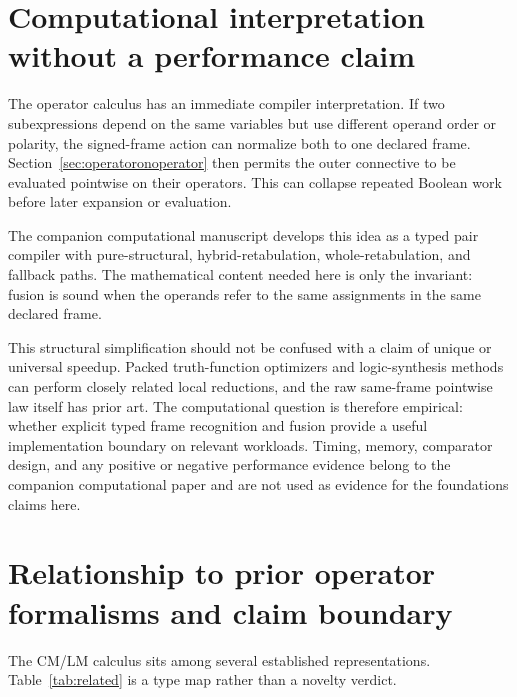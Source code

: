 \documentclass[11pt]{article}
\theoremstyle{definition}
\theoremstyle{remark}
\begin{document}
\section{Computational interpretation without a performance claim}
\label{sec:computational}

The operator calculus has an immediate compiler interpretation.  If two subexpressions depend on the same variables but use different operand order or polarity, the signed-frame action can normalize both to one declared frame.  Section~\ref{sec:operatoronoperator} then permits the outer connective to be evaluated pointwise on their operators.  This can collapse repeated Boolean work before later expansion or evaluation.

The companion computational manuscript \cite{TheoryCompiler2026} develops this idea as a typed pair compiler with pure-structural, hybrid-retabulation, whole-retabulation, and fallback paths.  The mathematical content needed here is only the invariant: fusion is sound when the operands refer to the same assignments in the same declared frame.

This structural simplification should not be confused with a claim of unique or universal speedup.  Packed truth-function optimizers and logic-synthesis methods can perform closely related local reductions, and the raw same-frame pointwise law itself has prior art.  The computational question is therefore empirical: whether explicit typed frame recognition and fusion provide a useful implementation boundary on relevant workloads.  Timing, memory, comparator design, and any positive or negative performance evidence belong to the companion computational paper and are not used as evidence for the foundations claims here.

\section{Relationship to prior operator formalisms and claim boundary}
\label{sec:related}

The CM/LM calculus sits among several established representations.  Table~\ref{tab:related} is a type map rather than a novelty verdict.
\end{document}
